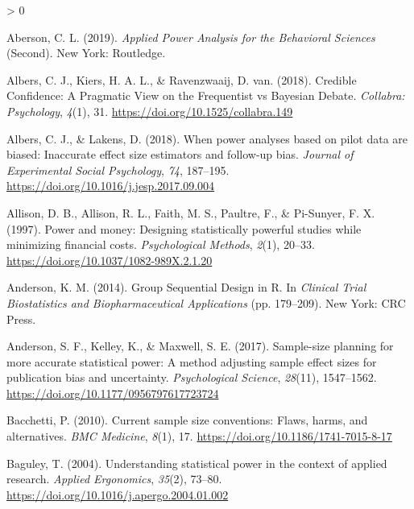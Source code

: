 \documentclass[
  english,
  ,jou,floatsintext]{apa6}
\newlength{\cslhangindent}
\newenvironment{CSLReferences}[2] %
 {%
  \setlength{\parindent}{0pt}
  \ifodd #1 \everypar{\setlength{\hangindent}{\cslhangindent}}\ignorespaces\fi
  \ifnum #2 > 0
  \setlength{\parskip}{#2\baselineskip}
  \fi
 }%
 {}
\begin{document}
\begingroup

\hypertarget{refs}{}
\begin{CSLReferences}{1}{0}
\leavevmode\hypertarget{ref-aberson_applied_2019}{}%
Aberson, C. L. (2019). \emph{Applied {Power Analysis} for the {Behavioral Sciences}} (Second). {New York}: {Routledge}.

\leavevmode\hypertarget{ref-albers_credible_2018}{}%
Albers, C. J., Kiers, H. A. L., \& Ravenzwaaij, D. van. (2018). Credible {Confidence}: {A Pragmatic View} on the {Frequentist} vs {Bayesian Debate}. \emph{Collabra: Psychology}, \emph{4}(1), 31. \url{https://doi.org/10.1525/collabra.149}

\leavevmode\hypertarget{ref-albers_when_2018}{}%
Albers, C. J., \& Lakens, D. (2018). When power analyses based on pilot data are biased: {Inaccurate} effect size estimators and follow-up bias. \emph{Journal of Experimental Social Psychology}, \emph{74}, 187--195. \url{https://doi.org/10.1016/j.jesp.2017.09.004}

\leavevmode\hypertarget{ref-allison_power_1997}{}%
Allison, D. B., Allison, R. L., Faith, M. S., Paultre, F., \& Pi-Sunyer, F. X. (1997). Power and money: {Designing} statistically powerful studies while minimizing financial costs. \emph{Psychological Methods}, \emph{2}(1), 20--33. \url{https://doi.org/10.1037/1082-989X.2.1.20}

\leavevmode\hypertarget{ref-anderson_group_2014}{}%
Anderson, K. M. (2014). Group {Sequential Design} in {R}. In \emph{Clinical {Trial Biostatistics} and {Biopharmaceutical Applications}} (pp. 179--209). {New York}: {CRC Press}.

\leavevmode\hypertarget{ref-anderson_sample-size_2017}{}%
Anderson, S. F., Kelley, K., \& Maxwell, S. E. (2017). Sample-size planning for more accurate statistical power: {A} method adjusting sample effect sizes for publication bias and uncertainty. \emph{Psychological Science}, \emph{28}(11), 1547--1562. \url{https://doi.org/10.1177/0956797617723724}

\leavevmode\hypertarget{ref-bacchetti_current_2010}{}%
Bacchetti, P. (2010). Current sample size conventions: {Flaws}, harms, and alternatives. \emph{BMC Medicine}, \emph{8}(1), 17. \url{https://doi.org/10.1186/1741-7015-8-17}

\leavevmode\hypertarget{ref-baguley_understanding_2004}{}%
Baguley, T. (2004). Understanding statistical power in the context of applied research. \emph{Applied Ergonomics}, \emph{35}(2), 73--80. \url{https://doi.org/10.1016/j.apergo.2004.01.002}


\end{CSLReferences}
\end{document}
